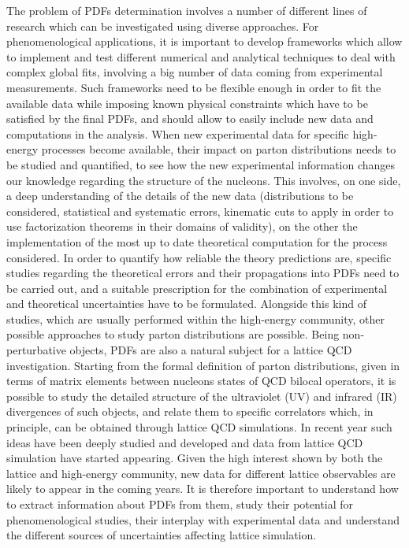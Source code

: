 The problem of PDFs determination involves a number of different lines of research which can be investigated 
using diverse approaches.
%
For phenomenological applications, it is important to develop frameworks which allow to implement and test
different numerical and analytical techniques to deal with complex global fits, involving a big number of data coming
from experimental measurements. Such frameworks need to be flexible enough in order to fit the available data 
while imposing known physical constraints which have to be satisfied by the final PDFs,
and should allow to easily include new data and computations in the analysis. 
%
When new experimental data for specific high-energy processes become available,
their impact on parton distributions needs to be studied and quantified, to see how the new experimental 
information changes our knowledge regarding the structure of the nucleons.
This involves, on one side, a deep understanding of the details of the new data (distributions to be considered,
statistical and systematic errors, kinematic cuts to apply in order to use factorization theorems in their domains of validity), 
on the other the implementation of the most up to date theoretical computation for the process considered.  
%
In order to quantify how reliable the theory predictions are, specific studies regarding the theoretical errors
and their propagations into PDFs need to be carried out, and a suitable prescription for the combination
of experimental and theoretical uncertainties have to be formulated.
%
Alongside this kind of studies, which are usually performed within the high-energy community,
other possible approaches to study parton distributions are possible.
Being non-perturbative objects, PDFs are also a natural subject for a lattice QCD investigation. 
Starting from the formal definition of parton distributions, given in terms of matrix elements between 
nucleons states of QCD bilocal operators, it is possible to study the detailed structure of the ultraviolet (UV)
and infrared (IR) divergences of such objects, and relate them to specific correlators which, in principle, 
can be obtained through lattice QCD simulations. In recent year such ideas have been deeply studied and developed
and data from lattice QCD simulation have started appearing. 
Given the high interest shown by both the lattice and high-energy community, new data for different lattice observables
are likely to appear in the coming years. 
It is therefore important to understand how to extract information about PDFs from them, 
study their potential for phenomenological studies,
their interplay with experimental data and understand the different sources of uncertainties 
affecting lattice simulation.

